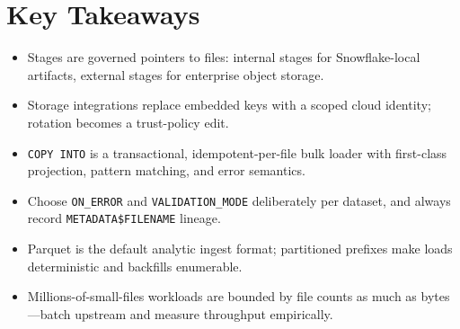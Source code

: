 \section*{Key Takeaways}
\begin{itemize}
    \item Stages are governed pointers to files: internal stages for Snowflake-local artifacts, external stages for enterprise object storage.
    \item Storage integrations replace embedded keys with a scoped cloud identity; rotation becomes a trust-policy edit.
    \item \texttt{COPY INTO} is a transactional, idempotent-per-file bulk loader with first-class projection, pattern matching, and error semantics.
    \item Choose \texttt{ON\_ERROR} and \texttt{VALIDATION\_MODE} deliberately per dataset, and always record \texttt{METADATA\$FILENAME} lineage.
    \item Parquet is the default analytic ingest format; partitioned prefixes make loads deterministic and backfills enumerable.
    \item Millions-of-small-files workloads are bounded by file counts as much as bytes---batch upstream and measure throughput empirically.
\end{itemize}

